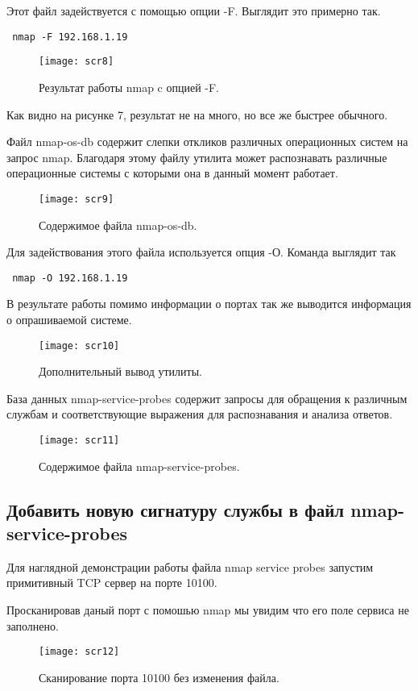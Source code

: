 \documentclass{article}
\begin{document}
 Этот файл задействуется с помощью опции -F. Выглядит это примерно так.
 \begin{verbatim}
 nmap -F 192.168.1.19
 \end{verbatim}
 \clearpage
 \begin{figure}[h!]
 	\centering
 	\texttt{[image: scr8]}
 	\caption{Результат работы nmap c опцией -F.}
 \end{figure}

 Как видно на рисунке 7, результат не на много, но все же быстрее обычного.
 
 Файл nmap-os-db содержит слепки откликов различных операционных систем на запрос nmap. Благодаря этому файлу утилита может распознавать различные операционные системы с которыми она в данный момент работает. 
 \begin{figure}[h!]
 	\centering
 	\texttt{[image: scr9]}
 	\caption{Содержимое файла nmap-os-db.}
 \end{figure}
 \clearpage
 Для задействования этого файла используется опция -О. Команда выглядит так
 \begin{verbatim}
 nmap -O 192.168.1.19
 \end{verbatim}
 
 В результате работы помимо информации о портах так же выводится информация о опрашиваемой системе.
 \begin{figure}[h!]
 	\centering
 	\texttt{[image: scr10]}
 	\caption{Дополнительный вывод утилиты.}
 \end{figure}
 
 База данных nmap-service-probes содержит запросы для обращения к различным службам и соответствующие выражения для распознавания и анализа ответов.
  
 \begin{figure}[h!]
 	\centering
 	\texttt{[image: scr11]}
 	\caption{Содержимое файла nmap-service-probes.}
 \end{figure} 
 \clearpage
 
 \subsection{Добавить новую сигнатуру службы в файл nmap-service-probes}
 
 Для наглядной демонстрации работы файла nmap service probes запустим примитивный TCP сервер на порте 10100. 
 
 Просканировав даный порт с помошью nmap мы увидим что его поле сервиса не заполнено.
  \begin{figure}[h!]
  	\centering
  	\texttt{[image: scr12]}
  	\caption{Сканирование порта 10100 без изменения файла.}
  \end{figure}
  
\end{document}
